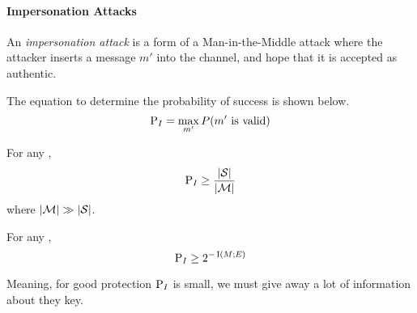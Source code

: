 \paragraph{Impersonation Attacks}\label{par:Attack_Authentication_Code-Impersonation}
\begin{definition}\label{def:Attack_Authentication_Code-Impersonation}
  An \emph{impersonation attack} is a form of a Man-in-the-Middle attack where the attacker inserts a message $m'$ into the channel, and hope that it is accepted as authentic.

  The equation to determine the probability of success is shown below.
  \begin{equation}\label{eq:Attack_Authentication_Code-Impersonation-Success}
    \operatorname{\operatorname{P}}_{I} = \max_{m'} P(m' \text{ is valid})
  \end{equation}
\end{definition}

\begin{theorem}\label{thm:Attack_Authentication_Code-Impersonation-Success_Bounds}
  For any ,
  \begin{equation}\label{eq:Attack_Authentication_Code-Impersonation-Success_Bound}
    \operatorname{\operatorname{P}}_{I} \geq \frac{\lvert \operatorname{\mathcal{S}} \rvert}{\lvert \operatorname{\mathcal{M}} \rvert}
  \end{equation}
  where $\lvert \operatorname{\mathcal{M}} \rvert \gg \lvert \operatorname{\mathcal{S}} \rvert$.
\end{theorem}

\begin{theorem}\label{thm:Impersonation-Simmons_Bound}
  For any ,
  \begin{equation}\label{eq:Impersonation-Simmons_Bound}
    \operatorname{\operatorname{P}}_{I} \geq 2^{-\operatorname{\operatorname{I}}(M; E)}
  \end{equation}

  Meaning, for good protection $\operatorname{\operatorname{P}}_{I}$ is small, we must give away a lot of information about they key.
\end{theorem}


